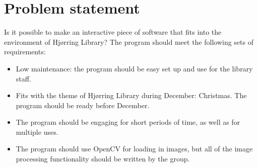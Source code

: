 \section{Problem statement}
Is it possible to make an interactive piece of software that fits into the environment of Hjørring Library? The program should meet the following sets of requirements:

\begin{itemize}
\item Low maintenance: the program should be easy set up and use for the library staff.
\item Fits with the theme of Hjørring Library during December: Christmas. The program should be ready before December.
\item The program should be engaging for short periods of time, as well as for multiple uses.
\item The program should use OpenCV for loading in images, but all of the image processing functionality should be written by the group.
\end{itemize}